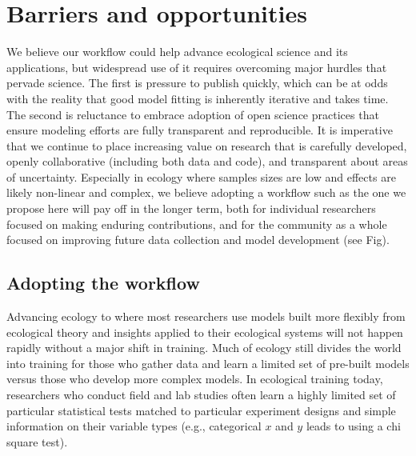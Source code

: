 \documentclass[11pt]{article}
\begin{document}
\section{Barriers and opportunities}

We believe our workflow could help advance ecological science and its applications, but widespread use of it requires overcoming major hurdles that pervade science.  
The first is pressure to publish quickly, which can be at odds with the reality that good model fitting is inherently iterative and takes time. The second is reluctance to embrace adoption of open science practices that ensure modeling efforts are fully transparent and reproducible. It is imperative that we continue to place increasing value on research that is carefully developed, openly collaborative (including both data and code), and transparent about areas of uncertainty. Especially in ecology where samples sizes are low and effects are likely non-linear and complex, we believe adopting a workflow such as the one we propose here will pay off in the longer term, both for individual researchers focused on making enduring contributions, and for the community as a whole focused on improving future data collection and model development (see Fig).

\subsection{Adopting the workflow}

Advancing ecology to where most researchers use models built more flexibly from ecological theory and insights applied to their ecological systems will not happen rapidly without a major shift in training. Much of ecology still divides the world into training for those who gather data and learn a limited set of pre-built models versus those who develop more complex models. In ecological training today, researchers who conduct field and lab studies often learn a highly limited set of particular statistical tests matched to particular experiment designs and simple information on their variable types (e.g., categorical $x$ and $y$ leads to using a chi square test).
\end{document}
